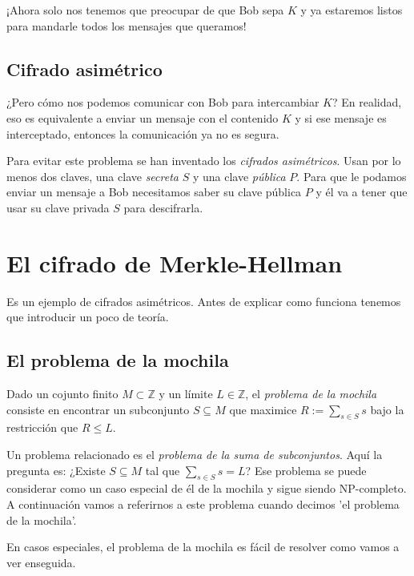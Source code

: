 \documentclass[12pt]{article}
\newcommand{\Z}{\mathbb{Z}}
\begin{document}
¡Ahora solo nos tenemos que preocupar de que Bob sepa $K$ y ya estaremos listos para mandarle todos los mensajes que queramos!

\subsection*{Cifrado asimétrico}

¿Pero cómo nos podemos comunicar con Bob para intercambiar $K$? En realidad, eso es equivalente a enviar un mensaje con el contenido $K$ y si ese mensaje es interceptado, entonces la comunicación ya no es segura.

Para evitar este problema se han inventado los \emph{cifrados asimétricos}. Usan por lo menos dos claves, una clave \emph{secreta} $S$ y una clave \emph{pública} $P$. Para que le podamos enviar un mensaje a Bob necesitamos saber su clave pública $P$ y él va a tener que usar su clave privada $S$ para descifrarla.

\section{El cifrado de Merkle-Hellman}

Es un ejemplo de cifrados asimétricos. Antes de explicar como funciona tenemos que introducir un poco de teoría.

\subsection*{El problema de la mochila}

Dado un cojunto finito $M \subset \Z$ y un límite $L \in \Z$, el \emph{problema de la mochila} consiste en encontrar un subconjunto $S \subseteq M$ que maximice $R := \sum_{s \in S}s$ bajo la restricción que $R \leq L$.

Un problema relacionado es el \emph{problema de la suma de subconjuntos}. Aquí la pregunta es: ¿Existe $S \subseteq M$ tal que $\sum_{s \in S}s = L$? Ese problema se puede considerar como un caso especial de él de la mochila y sigue siendo NP-completo. A continuación vamos a referirnos a este problema cuando decimos 'el problema de la mochila'.

En casos especiales, el problema de la mochila es fácil de resolver como vamos a ver enseguida.
\end{document}
